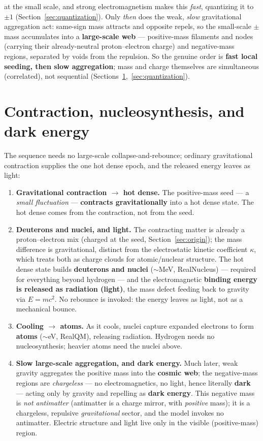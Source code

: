 \documentclass[11pt]{article}
\begin{document}
at the small scale, and strong electromagnetism makes this \emph{fast}, quantizing it to $\pm1$
(Section~\ref{sec:quantization}). Only \emph{then} does the weak, \emph{slow} gravitational aggregation act:
same-sign mass attracts and opposite repels, so the small-scale $\pm$mass accumulates into a
\textbf{large-scale web} --- positive-mass filaments and nodes (carrying their already-neutral
proton--electron charge) and negative-mass regions, separated by voids from the repulsion. So the genuine
order is \textbf{fast local seeding, then slow aggregation}; mass and charge themselves are simultaneous
(correlated), not sequential (Sections~\ref{sec:bounce},~\ref{sec:quantization}).

\section{Contraction, nucleosynthesis, and dark energy}\label{sec:bounce}
The sequence needs no large-scale collapse-and-rebounce; ordinary gravitational contraction supplies the
one hot dense epoch, and the released energy leaves as light:
\begin{enumerate}
\item \textbf{Gravitational contraction $\to$ hot dense.} The positive-mass seed --- a \emph{small
fluctuation} --- \textbf{contracts gravitationally} into a hot dense state. The hot dense comes from the
contraction, not from the seed.
\item \textbf{Deuterons and nuclei, and light.} The contracting matter is already a proton--electron mix
(charged at the seed, Section~\ref{sec:origin}); the mass difference is gravitational, distinct from the
electrostatic kinetic coefficient $\kappa$, which treats both as charge clouds for atomic/nuclear
structure. The hot dense state builds \textbf{deuterons and nuclei} (${\sim}$MeV, RealNucleus) ---
required for everything beyond hydrogen --- and the electromagnetic \textbf{binding energy is released as
radiation (light)}, the mass defect feeding back to gravity via $E=mc^2$. No rebounce is invoked: the
energy leaves as light, not as a mechanical bounce.
\item \textbf{Cooling $\to$ atoms.} As it cools, nuclei capture expanded electrons to
form \textbf{atoms} (${\sim}$eV, RealQM), releasing radiation. Hydrogen needs no nucleosynthesis;
heavier atoms need the nuclei above.
\item \textbf{Slow large-scale aggregation, and dark energy.} Much later, weak gravity aggregates the
positive mass into the \textbf{cosmic web}; the negative-mass regions are \emph{chargeless} --- no
electromagnetics, no light, hence literally \textbf{dark} --- acting only by gravity and repelling as
\textbf{dark energy}. This negative mass is \emph{not antimatter} (antimatter is a charge mirror, with
\emph{positive} mass); it is a chargeless, repulsive \emph{gravitational} sector, and the model invokes no
antimatter. Electric structure and light live only in the visible (positive-mass) region.
\end{enumerate}
\end{document}
